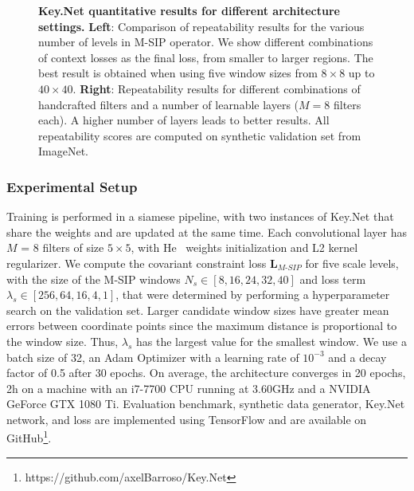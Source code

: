 \begin{figure}[ht]
\begin{minipage}[b]{.57\textwidth}
    \vspace{-2.45cm}
\end{minipage}
\vspace{-0.25cm}
\caption[Key.Net quantitative results for different architecture settings]{\textbf{Key.Net quantitative results for different architecture settings.} \textbf{Left}: Comparison of repeatability results for the various number of levels in M-SIP operator. We show different combinations of context losses as the final loss,  from smaller to larger regions. The best result is obtained when using five window sizes from $8\times 8$ up to $40\times 40$. \textbf{Right}: Repeatability results for different combinations of handcrafted filters and a number of learnable layers ($M=8$ filters each). A higher number of layers leads to better results. All repeatability scores are computed on synthetic validation set from ImageNet.}
\label{table:context_losses_and_learnableblocks}
\end{figure}


\subsubsection{Experimental Setup}
\label{subsec:Implementation_Details}
Training is performed in a siamese pipeline, with two instances of Key.Net that share the weights and are updated at the same time. Each convolutional layer has $M$ = 8 filters of size $5 \times 5$, with He~\cite{HE_initializatio} weights initialization and L2 kernel regularizer. We compute the covariant constraint loss $\mathbf{L}_{M\mbox{-}SIP}$ for five scale levels, with the size of the M-SIP windows $N_s \in [8, 16, 24, 32, 40]$ and loss term $\lambda_s \in [256, 64, 16, 4, 1]$, that were determined by performing a hyperparameter search on the validation set. Larger candidate window sizes have greater mean errors between coordinate points since the maximum distance is proportional to the window size. Thus, $\lambda_s$ has the largest value for the smallest window. We use a batch size of 32, an Adam Optimizer with a learning rate of $10^{-3}$ and a decay factor of 0.5 after 30 epochs. On average, the architecture converges in 20 epochs, 2h on a machine with an i7-7700 CPU running at 3.60GHz and a NVIDIA GeForce GTX 1080 Ti. Evaluation benchmark, synthetic data generator, Key.Net network, and loss are implemented using TensorFlow and are available on GitHub\footnote{https://github.com/axelBarroso/Key.Net}. 


